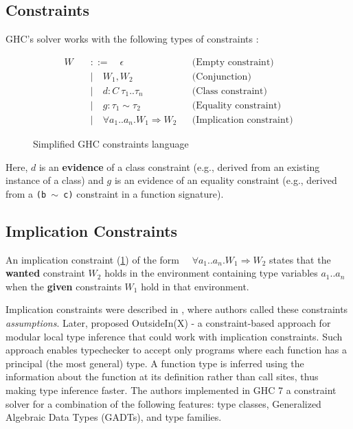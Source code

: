 \subsection{Constraints}

GHC's solver works with the following types of constraints \cite{wits-type-inference-using-constraints}:

\begin{figure}[h]
    \begin{align*}
        W \quad & ::= \quad \epsilon                                 &  & \text{(Empty constraint)}       \\
                & \mid \quad W_1, W_2                                &  & \text{(Conjunction)}            \\
                & \mid \quad d : C~\tau_1 .. \tau_n                  &  & \text{(Class constraint)}       \\
                & \mid \quad g : \tau_1 \sim \tau_2                  &  & \text{(Equality constraint)}    \\
                & \mid \quad \forall a_1 .. a_n. W_1 \Rightarrow W_2 &  & \text{(Implication constraint)}
    \end{align*}
    \caption{Simplified GHC constraints language}
    \label{ghc-constraints}
\end{figure}

Here, $d$ is an \textbf{evidence} of a class constraint (e.g., derived from an existing instance of a class) and $g$ is an evidence of an equality constraint (e.g., derived from a \texttt{(b $\sim$ c)} constraint in a function signature).

\subsection{Implication Constraints}

An implication constraint (\cref{ghc-constraints}) of the form $\quad \forall a_1 .. a_n. W_1 \Rightarrow W_2$ states that the \textbf{wanted} constraint $W_2$ holds in the environment containing type variables $a_1 .. a_n$ when the \textbf{given} constraints $W_1$ hold in that environment.

Implication constraints were described in \cite{essence-of-ml-type-inference}, where authors called these constraints \textit{assumptions}. Later, \citeauthor{vytiniotis-outsideinx-2011} \cite{vytiniotis-outsideinx-2011}
proposed OutsideIn(X) - a constraint-based approach for modular local type inference that could work with implication constraints. Such approach enables typechecker to accept only programs where each function has a principal (the most general) type. A function type is inferred using the information about the function at its definition rather than call sites, thus making type inference faster. The authors implemented in GHC 7 a constraint solver for a combination of the following features: type classes, Generalized Algebraic Data Types (GADTs), and type families.

